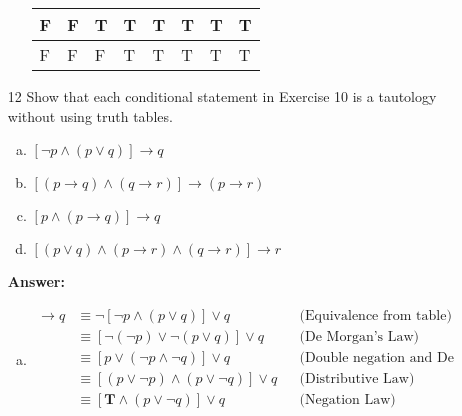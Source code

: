 \begin{itemize}
\begin{enumerate}[a.]
\begin{tabular}{*{6}{|l} *{2}{|p{3.2cm}}|}
                        \hline
                        F          & F          & T          & T          & T         & T         & T                                             & T                                                    \\
                        \hline
                        F          & F          & F          & T          & T         & T         & T                                             & T                                                    \\
                        \hline
                    \end{tabular}

          \end{enumerate}
    \item[12]Show that each conditional statement in Exercise 10 is a tautology without using truth tables.
          \begin{enumerate}[a.]
              \item $[\neg p \land (p \lor q)] \to q$
              \item $[(p \to q) \land (q \to r)] \to (p \to r)$
              \item $[p \land (p \to q)] \to q$
              \item $[(p \lor q) \land (p \to r) \land (q \to r)] \to r$
          \end{enumerate}
          \textbf{Answer:}
          \begin{enumerate}[a.]
              \item \begin{align*}
                        [\neg p \land (p \lor q)] \to q
                         & \equiv \neg[\neg p \land (p \lor q)] \lor q                         &  & \text{(Equivalence from table)}              \\
                         & \equiv [\neg(\neg p) \lor \neg(p \lor q)] \lor q                    &  & \text{(De Morgan's Law)}                     \\
                         & \equiv [p \lor (\neg p \land \neg q)] \lor q                        &  & \text{(Double negation and De Morgan's Law)} \\
                         & \equiv [(p \lor \neg p) \land (p \lor \neg q)] \lor q               &  & \text{(Distributive Law)}                    \\
                         & \equiv [\mathbf{T} \land (p \lor \neg q)] \lor q                    &  & \text{(Negation Law)}                        \\

\end{align*}
\end{enumerate}
\end{itemize}
